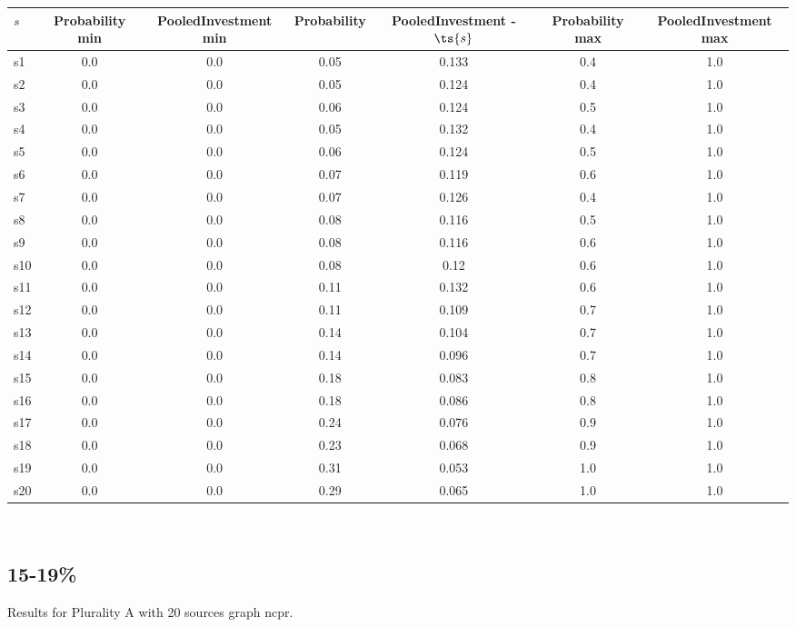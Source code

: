 \documentclass{article}
\begin{document}
\noindent\begin{tabular}{|l|c|c|c|c|c|c|}
\hline
$s$& Probability min & PooledInvestment min & Probability & PooledInvestment - $\ts{s}$ & Probability max & PooledInvestment max\\
\hline
s1 &0.0 & 0.0 & 0.05 & 0.133 & 0.4 & 1.0\\
\hline
s2 &0.0 & 0.0 & 0.05 & 0.124 & 0.4 & 1.0\\
\hline
s3 &0.0 & 0.0 & 0.06 & 0.124 & 0.5 & 1.0\\
\hline
s4 &0.0 & 0.0 & 0.05 & 0.132 & 0.4 & 1.0\\
\hline
s5 &0.0 & 0.0 & 0.06 & 0.124 & 0.5 & 1.0\\
\hline
s6 &0.0 & 0.0 & 0.07 & 0.119 & 0.6 & 1.0\\
\hline
s7 &0.0 & 0.0 & 0.07 & 0.126 & 0.4 & 1.0\\
\hline
s8 &0.0 & 0.0 & 0.08 & 0.116 & 0.5 & 1.0\\
\hline
s9 &0.0 & 0.0 & 0.08 & 0.116 & 0.6 & 1.0\\
\hline
s10 &0.0 & 0.0 & 0.08 & 0.12 & 0.6 & 1.0\\
\hline
s11 &0.0 & 0.0 & 0.11 & 0.132 & 0.6 & 1.0\\
\hline
s12 &0.0 & 0.0 & 0.11 & 0.109 & 0.7 & 1.0\\
\hline
s13 &0.0 & 0.0 & 0.14 & 0.104 & 0.7 & 1.0\\
\hline
s14 &0.0 & 0.0 & 0.14 & 0.096 & 0.7 & 1.0\\
\hline
s15 &0.0 & 0.0 & 0.18 & 0.083 & 0.8 & 1.0\\
\hline
s16 &0.0 & 0.0 & 0.18 & 0.086 & 0.8 & 1.0\\
\hline
s17 &0.0 & 0.0 & 0.24 & 0.076 & 0.9 & 1.0\\
\hline
s18 &0.0 & 0.0 & 0.23 & 0.068 & 0.9 & 1.0\\
\hline
s19 &0.0 & 0.0 & 0.31 & 0.053 & 1.0 & 1.0\\
\hline
s20 &0.0 & 0.0 & 0.29 & 0.065 & 1.0 & 1.0\\
\hline
\end{tabular}\\

\newpage

\subsection{15-19\%}

\noindent Results for Plurality A with 20 sources graph ncpr.
\end{document}
